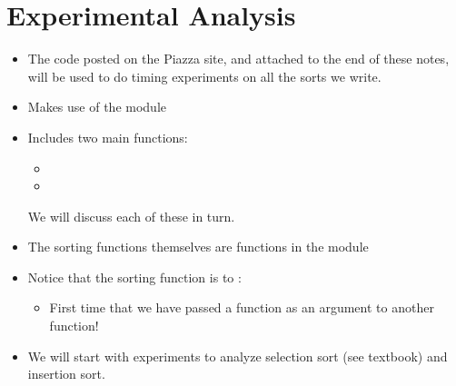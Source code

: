 \documentclass[letterpaper,10pt,english]{sphinxmanual}
\begin{document}
\section{Experimental Analysis}
\label{\detokenize{lecture_notes/lec21_sorting:experimental-analysis}}\begin{itemize}
\item {} 
The code  posted on the Piazza site, and attached to
the end of these notes, will be used to do timing experiments on all
the sorts we write.

\item {} 
Makes use of the  module

\item {} 
Includes two main functions:
\begin{itemize}
\item {} 

\item {} 

\end{itemize}

We will discuss each of these in turn.

\item {} 
The sorting functions themselves are functions in the module 

\item {} 
Notice that the sorting function is  to
:
\begin{itemize}
\item {} 
First time that we have passed a function as an argument to
another function!

\end{itemize}

\item {} 
We will start with experiments to analyze selection sort (see
textbook) and insertion sort.

\end{itemize}
\end{document}
